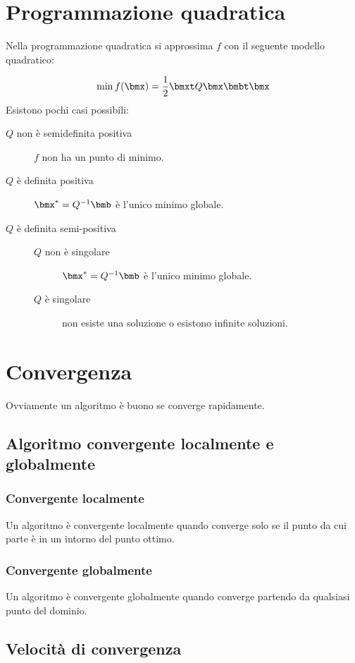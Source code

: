 \documentclass[\main/main.tex]{subfiles}
\begin{document}
\chapter{Programmazione quadratica}
Nella programmazione quadratica si approssima \(f\) con il seguente modello quadratico:

\[
    \min f(\bmx) = \frac{1}{2}\bmxt Q\bmx  \bmbt \bmx
\]
Esistono pochi casi possibili:

\begin{description}
    \item[\(Q\) non è semidefinita positiva] \(f\) non ha un punto di minimo.
    \item[\(Q\) è definita positiva] \(\bmx^* = Q^{-1}\bmb \) è l'unico minimo globale.
    \item[\(Q\) è definita semi-positiva]
          \begin{description}
              \item[\(Q\) non è singolare]  \(\bmx^* = Q^{-1}\bmb \) è l'unico minimo globale.
              \item[\(Q\) è singolare] non esiste una soluzione o esistono infinite soluzioni.
          \end{description}
\end{description}

\chapter{Convergenza}
Ovviamente un algoritmo è buono se converge rapidamente.

\section{Algoritmo convergente localmente e globalmente}
\subsection{Convergente localmente}
Un algoritmo è convergente localmente quando converge solo se il punto da cui parte è in un intorno del punto ottimo.
\subsection{Convergente globalmente}
Un algoritmo è convergente globalmente quando converge partendo da qualsiasi punto del dominio.

\section{Velocità di convergenza}
\end{document}
